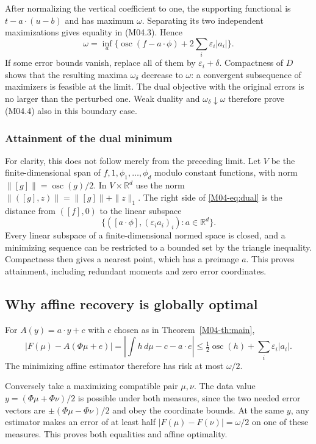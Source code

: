 \documentclass[11pt,a4paper]{article}
\theoremstyle{definition}\newtheorem{definition}[theorem]{Definition}
\theoremstyle{remark}\newtheorem{remark}[theorem]{Remark}
\newcommand{\R}{\mathbb R}\newcommand{\C}{\mathbb C}\newcommand{\N}{\mathbb N}
\numberwithin{equation}{section}
\begin{document}
After normalizing the vertical coefficient to one, the supporting functional is $t-a\cdot(u-b)$ and has maximum $\omega$. Separating its two independent maximizations gives equality in (M04.3). Hence
\[
 \omega=\inf_a\{\operatorname{osc}(f-a\cdot\phi)+2\textstyle\sum_i\varepsilon_i|a_i|\}.
\tag{M04.4}
\]
If some error bounds vanish, replace all of them by $\varepsilon_i+\delta$. Compactness of $D$ shows that the resulting maxima $\omega_\delta$ decrease to $\omega$: a convergent subsequence of maximizers is feasible at the limit. The dual objective with the original errors is no larger than the perturbed one. Weak duality and $\omega_\delta\downarrow\omega$ therefore prove (M04.4) also in this boundary case.

\subsubsection{Attainment of the dual minimum}
For clarity, this does not follow merely from the preceding limit. Let $V$ be the finite-dimensional span of $f,1,\phi_1,\ldots,\phi_d$ modulo constant functions, with norm $\|[g]\|=\operatorname{osc}(g)/2$. In $V\times\R^d$ use the norm $\|([g],z)\|=\|[g]\|+\|z\|_1$. The right side of \eqref{M04-eq:dual} is the distance from $([f],0)$ to the linear subspace
\[
 \{([a\cdot\phi],(\varepsilon_i a_i)_i):a\in\R^d\}.
\]
Every linear subspace of a finite-dimensional normed space is closed, and a minimizing sequence can be restricted to a bounded set by the triangle inequality. Compactness then gives a nearest point, which has a preimage $a$. This proves attainment, including redundant moments and zero error coordinates.

\subsection{Why affine recovery is globally optimal}\label{M04-sec-3}
For $A(y)=a\cdot y+c$ with $c$ chosen as in Theorem~\ref{M04-th:main},
\[
 |F(\mu)-A(\Phi\mu+e)|
 =\left|\int h\,d\mu-c-a\cdot e\right|
 \le\tfrac12\operatorname{osc}(h)+\sum_i\varepsilon_i|a_i|.
\]
The minimizing affine estimator therefore has risk at most $\omega/2$.

Conversely take a maximizing compatible pair $\mu,\nu$. The data value $y=(\Phi\mu+\Phi\nu)/2$ is possible under both measures, since the two needed error vectors are $\pm(\Phi\mu-\Phi\nu)/2$ and obey the coordinate bounds. At the same $y$, any estimator makes an error of at least half $|F(\mu)-F(\nu)|=\omega/2$ on one of these measures. This proves both equalities and affine optimality.
\end{document}
